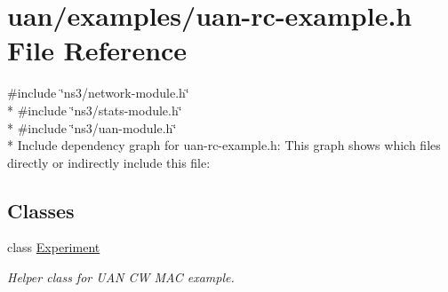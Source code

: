 \hypertarget{uan-rc-example_8h}{}\section{uan/examples/uan-\/rc-\/example.h File Reference}
\label{uan-rc-example_8h}
{\ttfamily \#include \char`\"{}ns3/network-\/module.\+h\char`\"{}}\\*
{\ttfamily \#include \char`\"{}ns3/stats-\/module.\+h\char`\"{}}\\*
{\ttfamily \#include \char`\"{}ns3/uan-\/module.\+h\char`\"{}}\\*
Include dependency graph for uan-\/rc-\/example.h\+:
This graph shows which files directly or indirectly include this file\+:
\subsection*{Classes}
\begin{DoxyCompactItemize}
\item 
class \hyperlink{classExperiment}{Experiment}
\begin{DoxyCompactList}\small\item\em Helper class for U\+AN CW M\+AC example. \end{DoxyCompactList}\end{DoxyCompactItemize}
